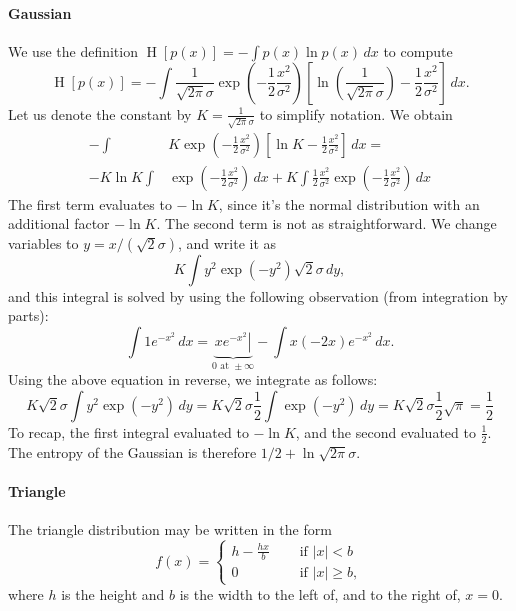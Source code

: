 \documentclass[12pt, a4paper]{article}
\newcommand{\abs}[1]{\left\lvert#1\right\rvert}
\renewcommand{\H}{\operatorname{H}}
\begin{document}
\paragraph{Gaussian} We use the definition $\H\left[p(x)\right] = - \int p(x) \ln p(x) \, dx$ to compute  
\begin{equation*}
	\H\left[p(x)\right] = 
	- \int \frac{1}{\sqrt{2 \pi} \sigma} 
	\exp \left( - \frac{1}{2} \frac{x^2}{\sigma^2} \right) 
	\left[ \ln \left( \frac{1}{\sqrt{2 \pi} \sigma } \right) - \frac{1}{2} \frac{x^2}{\sigma^2} \right] \, dx.
\end{equation*}
Let us denote the constant by $K = \frac{1}{\sqrt{2 \pi} \sigma} $ to simplify notation. We obtain
\begin{align*}
	- \int & K
	\exp \left( - \frac{1}{2} \frac{x^2}{\sigma^2} \right) 
	\left[ \ln K - \frac{1}{2} \frac{x^2}{\sigma^2} \right] \, dx = \\
	- K \ln K \int & 
	\exp \left( - \frac{1}{2} \frac{x^2}{\sigma^2} \right) \, dx + K \int  \frac{1}{2} \frac{x^2}{\sigma^2} \exp \left( - \frac{1}{2} \frac{x^2}{\sigma^2} \right)  \, dx
\end{align*}
The first term evaluates to $-\ln K$, since it's the normal distribution with an additional factor $-\ln K$.
The second term is not as straightforward.
We change variables to $y = x / \left( \sqrt{2} \sigma \right)$, and write it as
\begin{equation*}
	K \int  y^2 \exp \left( - y^2 \right) \sqrt{2} \sigma \, dy,
\end{equation*}
and this integral is solved by using the following observation (from integration by parts):
\begin{equation*}
	\int 1 e^{-x^2} \, dx = \underbrace{\left. x e^{-x^2} \right|}_{0\text{ at } \pm \infty} - \int x (-2x) e^{-x^2} \, dx.
\end{equation*}
Using the above equation in reverse, we integrate as follows:
\begin{equation*}
	K \sqrt{2} \sigma \int  y^2 \exp \left( - y^2 \right)  \, dy = 	K \sqrt{2} \sigma \frac{1}{2}\int  \exp \left( - y^2 \right)  \, dy = K \sqrt{2} \sigma \frac{1}{2} \sqrt{\pi} = \frac{1}{2}
\end{equation*}
To recap, the first integral evaluated to $- \ln K$, and the second evaluated to $\frac{1}{2}$.
The entropy of the Gaussian is therefore $1/2 + \ln \sqrt{2 \pi } \sigma$.

\paragraph{Triangle}
The triangle distribution may be written in the form
\begin{equation*}
	f(x) = \begin{cases}
	h - \frac{hx}{b} &\quad \text{ if } \abs{x} < b\\
	0 &\quad \text{ if } \abs{x} \geq b,
	\end{cases}
\end{equation*}
where $h$ is the height and $b$ is the width to the left of, and to the right of, $x=0$.
\end{document}
